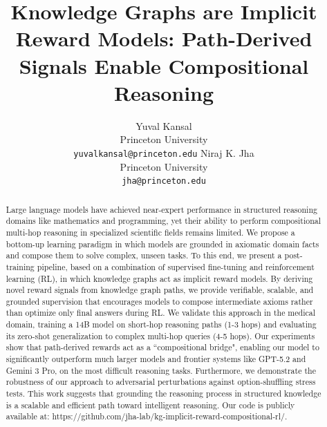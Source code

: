 \documentclass{article}
\title{Knowledge Graphs are Implicit Reward Models: Path-Derived Signals Enable Compositional Reasoning}
\author{
  Yuval Kansal \\
  Princeton University \\
  \texttt{yuvalkansal@princeton.edu}
  \And
  Niraj K. Jha \\
  Princeton University \\
  \texttt{jha@princeton.edu}
  }
\theoremstyle{plain}
\theoremstyle{definition}
\theoremstyle{remark}
\begin{document}
\maketitle

\newcommand{\preprintnotice}[1]{%
  \def\@preprinttext{#1}%
  \let\@oldthanksfootnote\thanks%
  \renewcommand{\thanks}[1]{}%
  \footnotetext[0]{\@preprinttext}%
  \let\thanks\@oldthanksfootnote%
}






\begin{abstract}
  Large language models have achieved near-expert performance in structured reasoning domains like mathematics and programming, yet their ability to perform compositional multi-hop reasoning in specialized scientific fields remains limited. We propose 
  a bottom-up learning paradigm in which models are grounded in axiomatic domain facts and compose them to solve complex, unseen tasks. To this end, we present a post-training pipeline, based on a combination of supervised fine-tuning and reinforcement learning (RL), in which knowledge graphs act as implicit reward models. By deriving novel reward signals from knowledge graph paths, we provide verifiable, scalable, and grounded supervision that encourages models to compose intermediate axioms rather than optimize only final answers during RL. We validate this approach in the medical domain, training a 14B model on short-hop reasoning paths (1-3 hops) and evaluating its zero-shot generalization to complex multi-hop queries (4-5 hops). Our experiments show that path-derived rewards act as a ``compositional bridge", enabling our model to significantly outperform much larger models and frontier systems like GPT-5.2 and Gemini 3 Pro, on the most difficult reasoning tasks. Furthermore, we demonstrate the robustness of our approach to adversarial perturbations against option-shuffling stress tests. This work suggests that grounding the reasoning process in structured knowledge is a scalable and efficient path toward intelligent reasoning. Our code is publicly available at: https://github.com/jha-lab/kg-implicit-reward-compositional-rl/.
  
\end{abstract}
\end{document}
